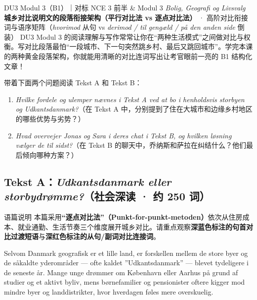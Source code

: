 {DU3 Modul 3（B1）｜对标 NCE 3 前半 \& Modul 3 \textit{Bolig, Geografi og Livsvalg}}
{\textbf{城乡对比说明文的段落衔接架构（平行对比法 vs 逐点对比法）} · 高阶对比衔接词与语序矩阵（\textit{hvorimod} 从句 vs \textit{derimod / til gengæld / på den anden side} 倒装）}
{DU3 Modul 3 的阅读理解与写作常常让你在“两种生活模式”之间做对比与权衡。写对比段落最怕“一段城市、下一句突然跳乡村、最后又跳回城市”。学完本课的两种黄金段落架构，你就能用清晰的对比连词写出让考官眼前一亮的 B1 结构化文章！}

\begin{foerduleaeser}
带着下面两个问题阅读 Tekst A 和 Tekst B：
\begin{enumerate}
  \item \textit{Hvilke fordele og ulemper nævnes i Tekst A ved at bo i henholdsvis storbyen og Udkantsdanmark?}（在 Tekst A 中，分别提到了住在大城市和边缘乡村地区的哪些优势与劣势？）
  \item \textit{Hvad overvejer Jonas og Sara i deres chat i Tekst B, og hvilken løsning vælger de til sidst?}（在 Tekst B 的聊天中，乔纳斯和萨拉在纠结什么？他们最后倾向哪种方案？）
\end{enumerate}
\end{foerduleaeser}


\subsection*{Tekst A：\textit{Udkantsdanmark eller storbydrømme?}（社会深读 · 约 250 词）}

\begin{tipbox}{语篇说明}
本篇采用\textbf{“逐点对比法”（Punkt-for-punkt-metoden）}依次从住房成本、就业通勤、生活节奏三个维度展开城乡对比。请重点观察\textbf{\color{NCDNavy}深蓝色标注的句首对比过渡短语}与\textbf{\color{NCDRed}深红色标注的从句/副词对比连接词}。
\end{tipbox}

Selvom Danmark geografisk er et lille land, er forskellen mellem de store byer og de såkaldte yderområder --- ofte kaldet ”Udkantsdanmark” --- blevet tydeligere i de seneste år. Mange unge drømmer om København eller Aarhus på grund af studier og et aktivt byliv, mens børnefamilier og pensionister oftere kigger mod mindre byer og landdistrikter, hvor hverdagen føles mere overskuelig.

